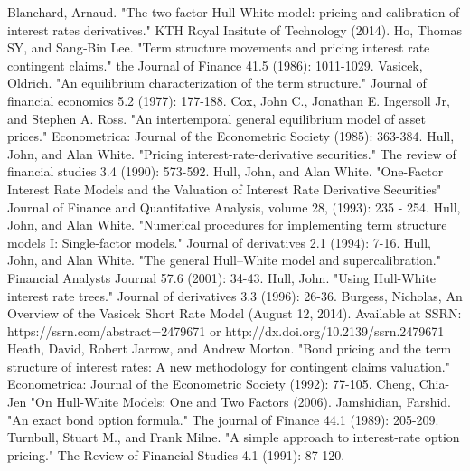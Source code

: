 \documentclass[11pt]{article}
\begin{document}
\begin{thebibliography}{MMMMM} 
 Blanchard, Arnaud. "The two-factor Hull-White model: pricing and calibration of interest rates derivatives." KTH Royal Insitute of Technology (2014).
 Ho, Thomas SY, and Sang‐Bin Lee. "Term structure movements and pricing interest rate contingent claims." the Journal of Finance 41.5 (1986): 1011-1029.
 Vasicek, Oldrich. "An equilibrium characterization of the term structure." Journal of financial economics 5.2 (1977): 177-188.
 Cox, John C., Jonathan E. Ingersoll Jr, and Stephen A. Ross. "An intertemporal general equilibrium model of asset prices." Econometrica: Journal of the Econometric Society (1985): 363-384.
 Hull, John, and Alan White. "Pricing interest-rate-derivative securities." The review of financial studies 3.4 (1990): 573-592.
 Hull, John, and Alan White. "One-Factor Interest Rate Models and the Valuation of Interest Rate Derivative Securities" Journal of Finance and Quantitative Analysis, volume 28,  (1993): 235 - 254.
 Hull, John, and Alan White. "Numerical procedures for implementing term structure models I: Single-factor models." Journal of derivatives 2.1 (1994): 7-16.
 Hull, John, and Alan White. "The general Hull–White model and supercalibration." Financial Analysts Journal 57.6 (2001): 34-43.
 Hull, John. "Using Hull-White interest rate trees." Journal of derivatives 3.3 (1996): 26-36.
 Burgess, Nicholas, An Overview of the Vasicek Short Rate Model (August 12, 2014). Available at SSRN: https://ssrn.com/abstract=2479671 or http://dx.doi.org/10.2139/ssrn.2479671
 Heath, David, Robert Jarrow, and Andrew Morton. "Bond pricing and the term structure of interest rates: A new methodology for contingent claims valuation." Econometrica: Journal of the Econometric Society (1992): 77-105.
 Cheng, Chia-Jen "On Hull-White Models: One and Two Factors (2006).
 Jamshidian, Farshid. "An exact bond option formula." The journal of Finance 44.1 (1989): 205-209.
  Turnbull, Stuart M., and Frank Milne. "A simple approach to interest-rate option pricing." The Review of Financial Studies 4.1 (1991): 87-120.

\end{thebibliography}


\end{document}
